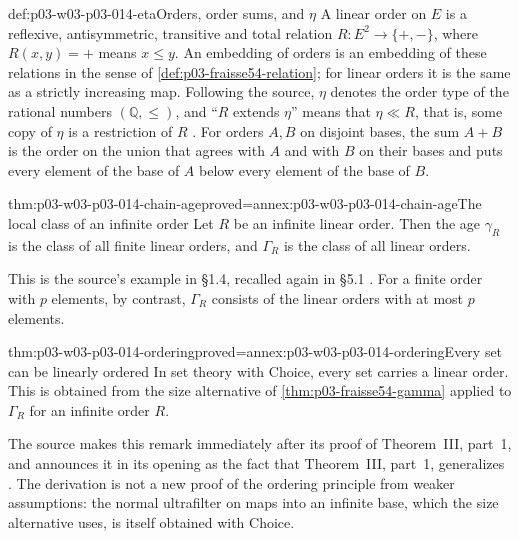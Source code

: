 \begin{hbconvention}{def:p03-w03-p03-014-eta}{Orders, order sums, and \(\eta\)}
A linear order on \(E\) is a reflexive, antisymmetric, transitive and
total relation \(R:E^2\to\{+,-\}\), where \(R(x,y)=+\) means
\(x\leq y\). An embedding of orders is an embedding of these relations
in the sense of \cref{def:p03-fraisse54-relation}; for linear orders it is
the same as a strictly increasing map.
Following the source, \(\eta\) denotes the order type of the rational
numbers \((\mathbb Q,\leq)\), and ``\(R\) extends \(\eta\)'' means
that \(\eta\ll R\), that is, some copy of \(\eta\) is a restriction of
\(R\) \cite[\S\S1.1, 5.1, 6.3]{Fraisse1954}.
For orders \(A,B\) on disjoint bases, the sum \(A+B\) is the order on the
union that agrees with \(A\) and with \(B\) on their bases and puts every
element of the base of \(A\) below every element of the base of \(B\).
\end{hbconvention}

\begin{hbtheorem}{thm:p03-w03-p03-014-chain-age}{proved=annex:p03-w03-p03-014-chain-age}{The local class of an infinite order}
Let \(R\) be an infinite linear order. Then the age \(\gamma_R\) is
the class of all finite linear orders, and \(\Gamma_R\) is the class of
all linear orders.
\end{hbtheorem}

This is the source's example in \S1.4, recalled again in \S5.1
\cite[\S1.4, p.~365; \S5.1, p.~377]{Fraisse1954}.
For a finite order with \(p\) elements, by contrast, \(\Gamma_R\)
consists of the linear orders with at most \(p\) elements.

\begin{hbcorollary}{thm:p03-w03-p03-014-ordering}{proved=annex:p03-w03-p03-014-ordering}{Every set can be linearly ordered}
In set theory with Choice, every set carries a linear order.
This is obtained from the size alternative of
\cref{thm:p03-fraisse54-gamma} applied to \(\Gamma_R\) for an infinite
order \(R\).
\end{hbcorollary}

The source makes this remark immediately after its proof of Theorem~III,
part~1, and announces it in its opening as the fact that Theorem~III,
part~1, generalizes \cite[\S1.1, p.~363; \S4.1, p.~374]{Fraisse1954}.
The derivation is not a new proof of the ordering principle from weaker
assumptions: the normal ultrafilter on maps into an infinite base, which
the size alternative uses, is itself obtained with Choice.

